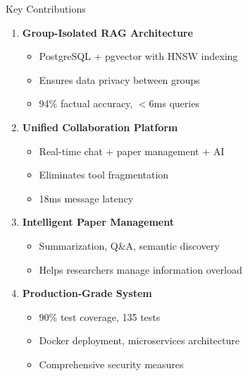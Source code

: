 \documentclass{beamer}
\begin{document}
\begin{frame}{Key Contributions}

\begin{enumerate}
    \item \textbf{Group-Isolated RAG Architecture}
    \begin{itemize}
        \item PostgreSQL + pgvector with HNSW indexing
        \item Ensures data privacy between groups
        \item 94\% factual accuracy, $<$6ms queries
    \end{itemize}
    
    \item \textbf{Unified Collaboration Platform}
    \begin{itemize}
        \item Real-time chat + paper management + AI
        \item Eliminates tool fragmentation
        \item 18ms message latency
    \end{itemize}
    
    \item \textbf{Intelligent Paper Management}
    \begin{itemize}
        \item Summarization, Q\&A, semantic discovery
        \item Helps researchers manage information overload
    \end{itemize}
    
    \item \textbf{Production-Grade System}
    \begin{itemize}
        \item 90\% test coverage, 135 tests
        \item Docker deployment, microservices architecture
        \item Comprehensive security measures
    \end{itemize}
\end{enumerate}

\end{frame}
\end{document}
